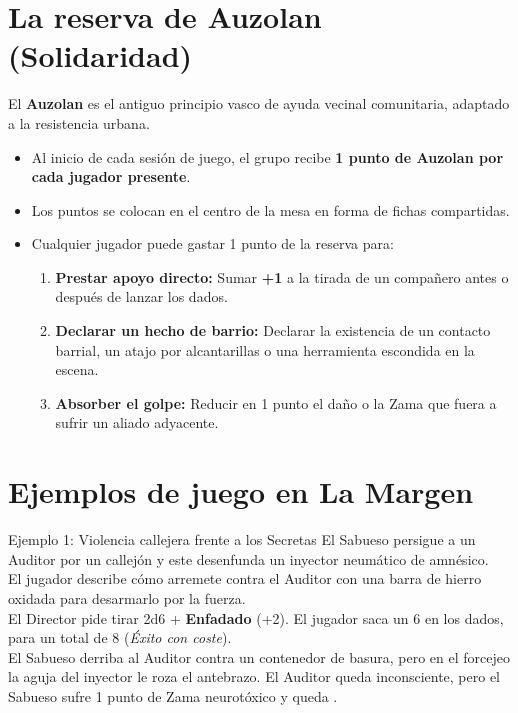 \section{La reserva de Auzolan (Solidaridad)}

El \textbf{Auzolan} es el antiguo principio vasco de ayuda vecinal comunitaria, adaptado a la resistencia urbana.
\begin{itemize}
  \item Al inicio de cada sesión de juego, el grupo recibe \textbf{1 punto de Auzolan por cada jugador presente}.
  \item Los puntos se colocan en el centro de la mesa en forma de fichas compartidas.
  \item Cualquier jugador puede gastar 1 punto de la reserva para:
    \begin{enumerate}
      \item \textbf{Prestar apoyo directo:} Sumar \textbf{+1} a la tirada de un compañero antes o después de lanzar los dados.
      \item \textbf{Declarar un hecho de barrio:} Declarar la existencia de un contacto barrial, un atajo por alcantarillas o una herramienta escondida en la escena.
      \item \textbf{Absorber el golpe:} Reducir en 1 punto el daño o la Zama que fuera a sufrir un aliado adyacente.
    \end{enumerate}
\end{itemize}

\section{Ejemplos de juego en La Margen}

\begin{CajaEjemplo}{Ejemplo 1: Violencia callejera frente a los Secretas}
 El Sabueso persigue a un Auditor por un callejón y este desenfunda un inyector neumático de amnésico.\\
 El jugador describe cómo arremete contra el Auditor con una barra de hierro oxidada para desarmarlo por la fuerza.\\
 El Director pide tirar 2d6 + \textbf{Enfadado} (+2). El jugador saca un 6 en los dados, para un total de 8 (\emph{Éxito con coste}).\\
 El Sabueso derriba al Auditor contra un contenedor de basura, pero en el forcejeo la aguja del inyector le roza el antebrazo. El Auditor queda inconsciente, pero el Sabueso sufre 1 punto de Zama neurotóxico y queda .
\end{CajaEjemplo}

